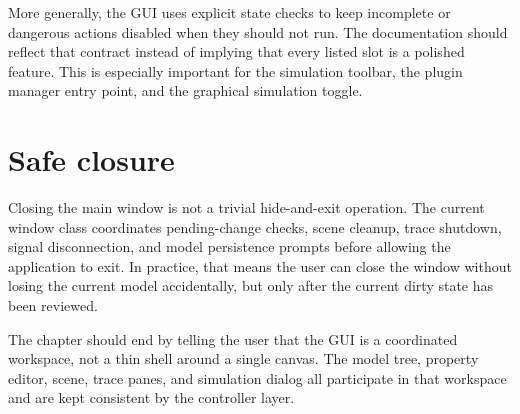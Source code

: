 More generally, the GUI uses explicit state checks to keep incomplete or
dangerous actions disabled when they should not run. The documentation should
reflect that contract instead of implying that every listed slot is a polished
feature. This is especially important for the simulation toolbar, the plugin
manager entry point, and the graphical simulation toggle.

\section{Safe closure}
\label{sec:main-graphical-application-closure}

Closing the main window is not a trivial hide-and-exit operation. The current
window class coordinates pending-change checks, scene cleanup, trace shutdown,
signal disconnection, and model persistence prompts before allowing the
application to exit. In practice, that means the user can close the window
without losing the current model accidentally, but only after the current
dirty state has been reviewed.

The chapter should end by telling the user that the GUI is a coordinated
workspace, not a thin shell around a single canvas. The model tree, property
editor, scene, trace panes, and simulation dialog all participate in that
workspace and are kept consistent by the controller layer.
